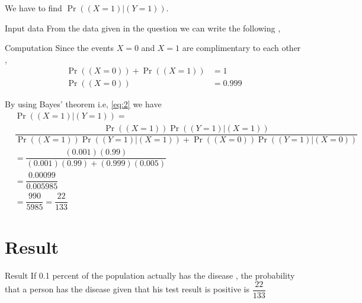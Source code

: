 \documentclass{beamer}
\providecommand{\pr}[1]{\ensuremath{\Pr\left(#1\right)}}
\begin{document}
    \begin{frame}{}
    \begin{table}[ht!]
        
        \caption{Defining the events for $Y$}
        \label{Table2}
    \end{table}
    We have to find $\pr{(X=1)|(Y=1)}$.
    \end{frame}
    
    \begin{frame}{Input data}
    From the data given in the question we can write the following ,
    \begin{table}[ht!]
        
        \caption{Input data}
        \label{Table3}
    \end{table}
    \end{frame}
    
    \begin{frame}{Computation}
    Since the events $X=0$ and $X=1$ are complimentary to each other ,
    \begin{align}
        \pr{(X=0)} + \pr{(X=1)} &= 1 \\
        \pr{(X=0)} &= 0.999
    \end{align} 
    \end{frame}
    
    \begin{frame}{}
        By using Bayes' theorem i.e, \eqref{eq:2} we have
    \begin{align}
        &\pr{(X=1)|(Y=1)} \nonumber = \\
        &\dfrac{\pr{(X=1)} \pr{(Y=1)|(X=1)}}{\pr{(X=1)} \pr{(Y=1)|(X=1)}+\pr{(X=0)} \pr{(Y=1)|(X=0)}} \\[10pt]
         &= \dfrac{(0.001)(0.99)}{(0.001)(0.99) + (0.999)(0.005)} \\[10pt]
         &= \dfrac{0.00099}{0.005985} \\[10pt]
         &= \dfrac{990}{5985} = \dfrac{22}{133}
    \end{align}
    \end{frame}
    
    \section{Result}
    \begin{frame}{Result}
        If 0.1 percent of the population actually has the disease , the probability that a person has the disease given that his test result is positive is $\dfrac{22}{133}$
    \end{frame}
\end{document}
